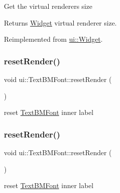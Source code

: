 Get the virtual renderer\textquotesingle{}s size \begin{DoxyReturn}{Returns}
\hyperlink{classui_1_1Widget}{Widget} virtual renderer size. 
\end{DoxyReturn}


Reimplemented from \hyperlink{classui_1_1Widget_a2ed0d41565593f78dc59c975d58a869e}{ui\+::\+Widget}.

\mbox{\label{classui_1_1TextBMFont_aaa506a5c411cfb4edcebe0e086251721}} 
\subsubsection{\texorpdfstring{reset\+Render()}{resetRender()}\hspace{0.1cm}{\footnotesize\ttfamily [1/2]}}
{\footnotesize\ttfamily void ui\+::\+Text\+B\+M\+Font\+::reset\+Render (\begin{DoxyParamCaption}{ }\end{DoxyParamCaption})}

reset \hyperlink{classui_1_1TextBMFont}{Text\+B\+M\+Font} inner label \mbox{\label{classui_1_1TextBMFont_aaa506a5c411cfb4edcebe0e086251721}} 
\subsubsection{\texorpdfstring{reset\+Render()}{resetRender()}\hspace{0.1cm}{\footnotesize\ttfamily [2/2]}}
{\footnotesize\ttfamily void ui\+::\+Text\+B\+M\+Font\+::reset\+Render (\begin{DoxyParamCaption}{ }\end{DoxyParamCaption})}

reset \hyperlink{classui_1_1TextBMFont}{Text\+B\+M\+Font} inner label \mbox{\label{classui_1_1TextBMFont_adaef5e07e587002487250c639a51f4e8}} 
